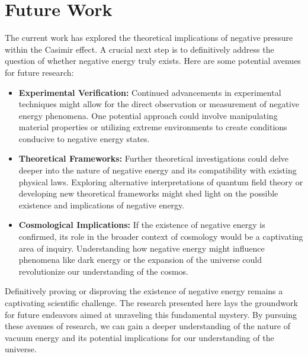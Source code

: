 \section{Future Work}

The current work has explored the theoretical implications of negative pressure within the Casimir effect. 
A crucial next step is to definitively address the question of whether negative energy truly exists. 
Here are some potential avenues for future research:
\begin{itemize}
    \item \textbf{Experimental Verification:} 
    Continued advancements in experimental techniques might allow for the direct observation 
    or measurement of negative energy phenomena. 
    One potential approach could involve manipulating material properties or utilizing extreme environments 
    to create conditions conducive to negative energy states.
    \item \textbf{Theoretical Frameworks:} 
    Further theoretical investigations could delve deeper into the nature of negative energy and 
    its compatibility with existing physical laws. 
    Exploring alternative interpretations of quantum field theory or developing new theoretical 
    frameworks might shed light on the possible existence and implications of negative energy.
    \item \textbf{Cosmological Implications:} 
    If the existence of negative energy is confirmed, 
    its role in the broader context of cosmology would be a captivating area of inquiry. 
    Understanding how negative energy might influence phenomena like dark energy or the expansion of 
    the universe could revolutionize our understanding of the cosmos.
\end{itemize}

Definitively proving or disproving the existence of negative energy remains a captivating scientific challenge. 
The research presented here lays the groundwork for future endeavors aimed at unraveling this fundamental mystery. 
By pursuing these avenues of research, we can gain a deeper understanding of the nature 
of vacuum energy and its potential implications for our understanding of the universe.